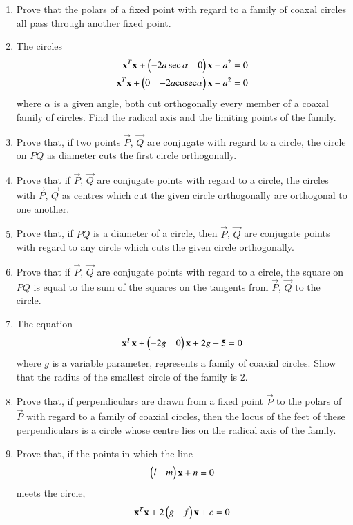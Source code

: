 \begin{enumerate}[label=\arabic*.,ref=\thesubsection.\theenumi]
 \item Prove that the polars of a fixed point with regard to a family of coaxal circles all pass through another fixed point.
 \item The circles
 \begin{align}
\mathbf{x}^T\mathbf{x}+\begin{pmatrix}-2a\sec\alpha & 0\end{pmatrix}\mathbf{x}-a^2 = 0
 \\
\mathbf{x}^T\mathbf{x}+\begin{pmatrix}0 & -2a\text{cosec}\alpha\end{pmatrix}\mathbf{x}-a^2 = 0
 \end{align}
 where $\alpha$ is a given angle, both cut orthogonally every member of a coaxal family of circles.  Find the radical axis and the limiting
 points of the family.
 \item Prove that, if two points $\vec{P}$, $\vec{Q}$ are conjugate with regard to a circle, the circle on $PQ$ as diameter cuts the first circle orthogonally. 
 \item Prove that if $\vec{P}$, $\vec{Q}$ are conjugate points with regard to a circle, the circles
 with $\vec{P}$, $\vec{Q}$ as centres which cut the given circle orthogonally are orthogonal to one another.
 \item Prove that, if $PQ$ is a diameter of a circle, then $\vec{P}$, $\vec{Q}$ are conjugate points with regard to
 any circle which cuts the given circle orthogonally.
 \item Prove that if $\vec{P}$, $\vec{Q}$ are conjugate points with regard to a circle, the square on $PQ$ is equal to the
 sum of the squares on the tangents from $\vec{P}$, $\vec{Q}$ to the circle.
\renewcommand{\theequation}{\theenumi}
 \item The equation 
 \begin{align}
\mathbf{x}^T\mathbf{x}+\begin{pmatrix}-2g & 0\end{pmatrix}\mathbf{x}+2g-5 = 0
 \end{align}
 where $g$ is a variable parameter, represents a family of coaxial circles.  
 Show that the radius of the smallest circle of the family is 2.
 \item Prove that, if perpendiculars are drawn from a fixed point $\vec{P}$ to the polars of $\vec{P}$ with regard to a
 family of coaxial circles, then the locus of the feet of these perpendiculars is a circle whose centre
 lies on the radical axis of the family.
 \item Prove that, if the points in which the line 
 \begin{align}
\begin{pmatrix}l & m\end{pmatrix}\mathbf{x}+n=0
 \end{align}
meets the circle, 
 \begin{align}
\vec{x}^T\vec{x}+2\myvec{g & f}\vec{x}+c = 0

\end{align}
\end{enumerate}
